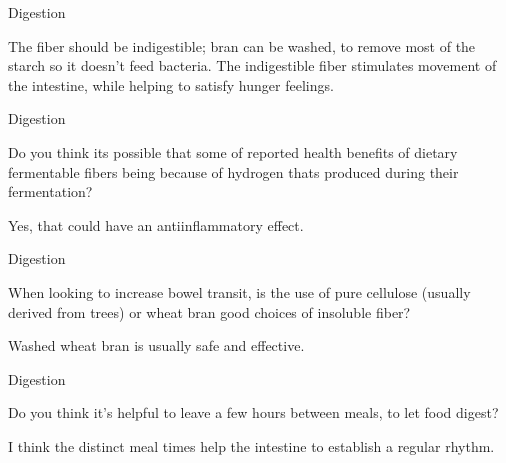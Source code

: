 \documentclass[11pt,oneside,openany,extrafontsizes]{memoir}
\begin{document}
\begin{standalonequote}{Digestion}

    \begin{answer}
       The fiber should be indigestible; bran can be washed, to remove most of the starch so it doesn't feed bacteria. The indigestible fiber stimulates movement of the intestine, while helping to satisfy hunger feelings. 
    \end{answer}
\end{standalonequote}

\begin{qaexchange}{Digestion}

    \begin{question}
        Do you think its possible that some of reported health benefits of dietary fermentable fibers being because of hydrogen thats produced during their fermentation?
    \end{question}

    \begin{answer}
       Yes, that could have an antiinflammatory effect. 
    \end{answer}
\end{qaexchange}

\begin{qaexchange}{Digestion}

    \begin{question}
        When looking to increase bowel transit, is the use of pure cellulose (usually derived from trees) or wheat bran good choices of insoluble fiber? 
    \end{question}

    \begin{answer}
      Washed wheat bran is usually safe and effective.
    \end{answer}
\end{qaexchange}

\begin{qaexchange}{Digestion}

    \begin{question}
        Do you think it's helpful to leave a few hours between meals, to let food digest?
    \end{question}

    \begin{answer}
      I think the distinct meal times help the intestine to establish a regular rhythm.
    \end{answer}
\end{qaexchange}
\end{document}
